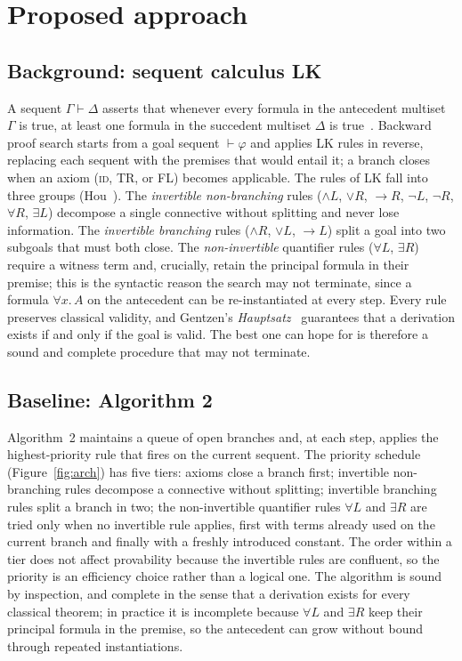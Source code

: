 \documentclass[runningheads]{llncs}
\begin{document}
\section{Proposed approach}
\label{sec:approach}


\subsection{Background: sequent calculus LK}
\label{sec:lk}


A sequent $\Gamma \vdash \Delta$ asserts that whenever every formula in
the antecedent multiset $\Gamma$ is true, at least one formula in the
succedent multiset $\Delta$ is true~\cite{TroelstraSchwichtenberg2000}.
Backward proof search starts from a goal sequent $\vdash\varphi$ and
applies LK rules in reverse, replacing each sequent with the premises
that would entail it; a branch closes when an axiom (\textsc{id},
\textsc{TR}, or \textsc{FL}) becomes applicable. The rules of LK fall into three groups (Hou~\cite[Ch.\,2]{Hou2021}). The
\emph{invertible non-branching} rules ($\wedge L$, $\vee R$, $\to R$,
$\neg L$, $\neg R$, $\forall R$, $\exists L$) decompose a single
connective without splitting and never lose information. The
\emph{invertible branching} rules ($\wedge R$, $\vee L$, $\to L$) split a
goal into two subgoals that must both close. The \emph{non-invertible}
quantifier rules ($\forall L$, $\exists R$) require a witness term and,
crucially, retain the principal formula in their premise; this is the
syntactic reason the search may not terminate, since a formula
$\forall x.\,A$ on the antecedent can be re-instantiated at every step.
Every rule preserves classical validity, and Gentzen's
\textit{Hauptsatz}~\cite{Gentzen1935} guarantees that a derivation
exists if and only if the goal is valid. The best one can hope for is
therefore a sound and complete procedure that may not terminate.


\subsection{Baseline: Algorithm 2}
\label{sec:baseline}


Algorithm~2 maintains a queue of open branches and, at each step,
applies the highest-priority rule that fires on the current sequent.
The priority schedule (Figure~\ref{fig:arch}) has five tiers: axioms
close a branch first; invertible non-branching rules decompose a
connective without splitting; invertible branching rules split a branch
in two; the non-invertible quantifier rules $\forall L$ and $\exists R$
are tried only when no invertible rule applies, first with terms
already used on the current branch and finally with a freshly
introduced constant. The order within a tier does not affect
provability because the invertible rules are confluent, so the priority
is an efficiency choice rather than a logical one. The algorithm is
sound by inspection, and complete in the sense that a derivation
exists for every classical theorem; in practice it is incomplete
because $\forall L$ and $\exists R$ keep their principal formula in the
premise, so the antecedent can grow without bound through repeated
instantiations.
\end{document}
